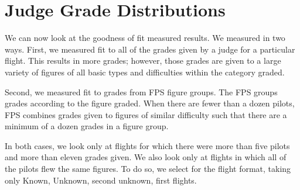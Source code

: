 \section{Judge Grade Distributions}

We can now look at the goodness of fit measured results.
We measured in two ways. First, we measured fit to all of
the grades given by a judge for a particular flight. This results in more
grades; however, those grades are given to a large variety of figures of
all basic types and difficulties within the category graded.

Second, we measured fit to grades from FPS figure groups. The FPS groups
grades according to the figure graded. When there are fewer than
a dozen pilots, FPS combines grades given to figures of similar difficulty such
that there are a minimum of a dozen grades in a figure group.

In both cases, we look only at flights for
which there were more than five pilots and more than eleven grades given.
We also look only at flights in which all of the pilots flew the same figures.
To do so, we select for the flight format, taking only Known, Unknown, second
unknown, first flights.
